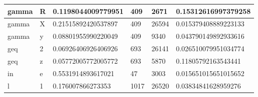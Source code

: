 \documentclass[hyperref={pdfpagelabels=false},table]{beamer}
\begin{document}
\begin{frame}
\begin{table}[]
{\begin{tabular}{|l|l|l|l|l|l|}
gamma          & R        & 0.1198044009779951   & 409        & 2671        & 0.15312616997379258   \\ \hline
gamma          & X        & 0.21515892420537897  & 409        & 26594       & 0.015379408889223133  \\ \hline
gamma          & y        & 0.08801955990220049  & 409        & 9340        & 0.043790149892933616  \\ \hline
geq            & 2        & 0.06926406926406926  & 693        & 26141       & 0.026510079951034774  \\ \hline
geq            & z        & 0.05772005772005772  & 693        & 5870        & 0.11805792163543441   \\ \hline
in             & e        & 0.5531914893617021   & 47         & 3003        & 0.015651015651015652  \\ \hline
l              & 1        & 0.176007866273353    & 1017       & 26520       & 0.03834841628959276   \\ \hline
\end{tabular}}
\end{table}
\end{frame}
\end{document}
